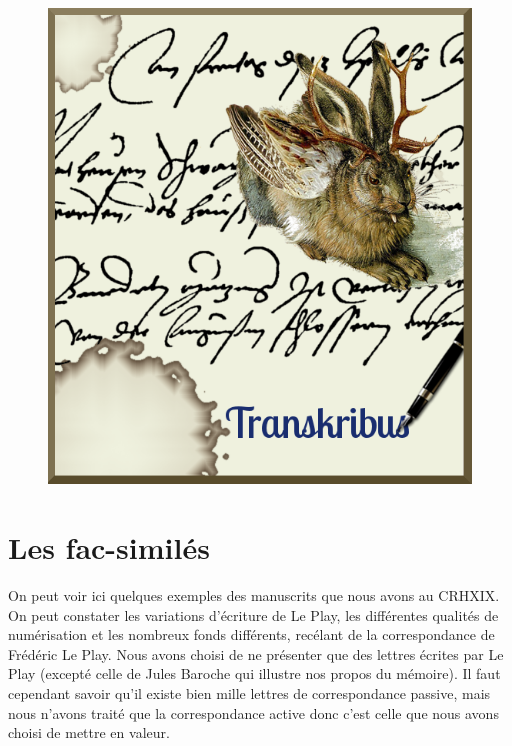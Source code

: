 \begin{figure}[ht]
    \centering
    \includegraphics[width=14cm]{images/TRANSKRIBUS.png}
\end{figure}

\section{Les fac-similés}

On peut voir ici quelques exemples des manuscrits que nous avons au CRHXIX. On peut constater les variations d'écriture de Le Play, les différentes qualités de numérisation et les nombreux fonds différents, recélant de la correspondance de Frédéric Le Play.
Nous avons choisi de ne présenter que des lettres écrites par Le Play (excepté celle de Jules Baroche qui illustre nos propos du mémoire). Il faut cependant savoir qu'il existe bien mille lettres de correspondance passive, mais nous n'avons traité que la correspondance active donc c'est celle que nous avons choisi de mettre en valeur.


